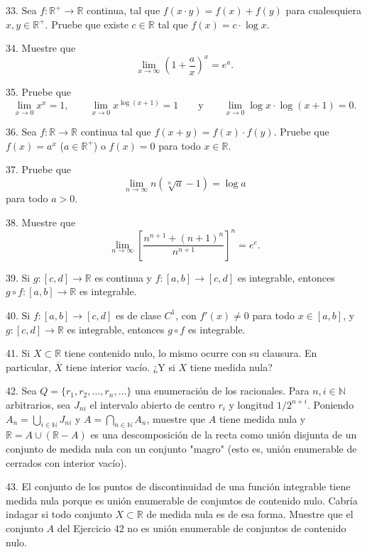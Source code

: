 \documentclass[12pt,oneside]{book}
\begin{document}
33. Sea \( f: \mathbb{R}^+ \to \mathbb{R} \) continua, tal que \( f(x \cdot y) = f(x) + f(y) \) para cualesquiera \( x, y \in \mathbb{R}^+ \). Pruebe que existe \( c \in \mathbb{R} \) tal que \( f(x) = c \cdot \log x \).

34. Muestre que
\[
\lim_{x \to \infty} \left( 1 + \frac{a}{x} \right)^x = e^a.
\]

35. Pruebe que
\[
\lim_{x \to 0} x^x = 1, \qquad \lim_{x \to 0} x^{\log(x+1)} = 1 \qquad \text{y} \qquad \lim_{x \to 0} \log x \cdot \log(x+1) = 0.
\]

36. Sea \( f: \mathbb{R} \to \mathbb{R} \) continua tal que \( f(x+y) = f(x) \cdot f(y) \). Pruebe que \( f(x) = a^x \) (\( a \in \mathbb{R}^+ \)) o \( f(x) = 0 \) para todo \( x \in \mathbb{R} \).

37. Pruebe que
\[
\lim_{n \to \infty} n(\sqrt[n]{a} - 1) = \log a
\]
para todo \( a > 0 \).

38. Muestre que
\[
\lim_{n \to \infty} \left[ \frac{n^{n+1} + (n+1)^n}{n^{n+1}} \right]^n = e^e.
\]

39. Si \( g: [c, d] \to \mathbb{R} \) es continua y \( f: [a, b] \to [c, d] \) es integrable, entonces \( g \circ f: [a, b] \to \mathbb{R} \) es integrable.

40. Si \( f: [a, b] \to [c, d] \) es de clase \( C^1 \), con \( f'(x) \neq 0 \) para todo \( x \in [a, b] \), y \( g: [c, d] \to \mathbb{R} \) es integrable, entonces \( g \circ f \) es integrable.

41. Si \( X \subset \mathbb{R} \) tiene contenido nulo, lo mismo ocurre con su clausura. En particular, \( \overline{X} \) tiene interior vacío. ¿Y si \( X \) tiene medida nula?

42. Sea \( Q = \{r_1, r_2, \ldots, r_n, \ldots\} \) una enumeración de los racionales. Para \( n, i \in \mathbb{N} \) arbitrarios, sea \( J_{ni} \) el intervalo abierto de centro \( r_i \) y longitud \( 1/2^{n+i} \). Poniendo \( A_n = \bigcup_{i \in \mathbb{N}} J_{ni} \) y \( A = \bigcap_{n \in \mathbb{N}} A_n \), muestre que \( A \) tiene medida nula y \( \mathbb{R} = A \cup (\mathbb{R} - A) \) es una descomposición de la recta como unión disjunta de un conjunto de medida nula con un conjunto "magro" (esto es, unión enumerable de cerrados con interior vacío).

43. El conjunto de los puntos de discontinuidad de una función integrable tiene medida nula porque es unión enumerable de conjuntos de contenido nulo. Cabría indagar si todo conjunto \( X \subset \mathbb{R} \) de medida nula es de esa forma. Muestre que el conjunto \( A \) del Ejercicio 42 no es unión enumerable de conjuntos de contenido nulo.
\end{document}
